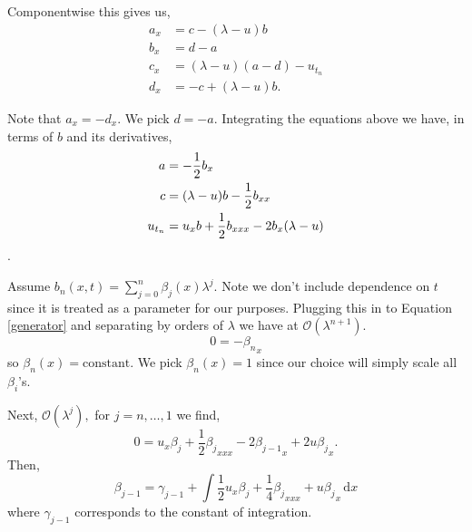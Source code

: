 \documentclass[12pt, a4paper]{article}
\newcommand{\ud}{\,\mathrm{d}}
\begin{document}
Componentwise this gives us,
\begin{align*}
  a_x &= c - (\lambda - u) b \\
  b_x &= d - a \\
  c_x &= (\lambda - u)(a - d) - u_{t_n} \\
  d_x &= -c + (\lambda - u) b.
\end{align*}

Note that $a_x = -d_x$.  We pick $d = -a$.  Integrating the equations
above we have, in terms of $b$ and its derivatives,
\begin{align}
  a &= -\frac{1}{2} b_x \notag \\
  c &= (\lambda - u) b - \frac{1}{2} b_{xx} \notag \\
  u_{t_n} & = u_x b + \frac{1}{2} b_{xxx} - 2b_x (\lambda - u)\label{generator}
\end{align}.

Assume $b_n(x,t) = \sum_{j=0}^n \beta_j(x) \lambda^j$. Note we don't
include dependence on $t$ since it is treated as a parameter for our
purposes. Plugging this in to Equation \eqref{generator} and separating
by orders of $\lambda$ we have at $\mathcal{O}(\lambda^{n+1}).$
\begin{equation} \label{heirarchy1}
  0 = -{\beta_n}_x
\end{equation}
so $\beta_n(x) = \text{constant}$.  We pick $\beta_n(x) = 1$ since our
choice will simply scale all $\beta_i$'s.

Next, $\mathcal{O}(\lambda^{j}),$ for $j=n,\ldots,1$ we find,
\[
  0 = u_x \beta_j + \frac{1}{2}{\beta_j}_{xxx} -
      2{\beta_{j-1}}_x + 2 u {\beta_j}_x.
\]
Then,
\begin{equation} \label{heirarchy2}
  \beta_{j-1} = \gamma_{j-1} + \int \frac{1}{2} u_x \beta_j +
                \frac{1}{4}{\beta_j}_{xxx} + u {\beta_j}_x \ud x
\end{equation}
where $\gamma_{j-1}$ corresponds to the constant of integration.
\end{document}
